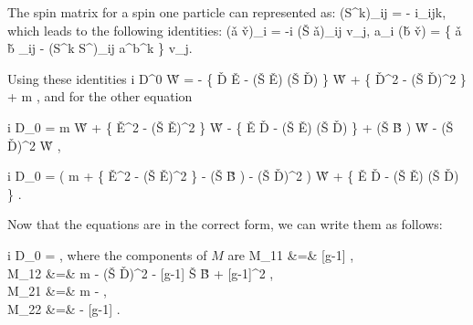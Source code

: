 The spin matrix for a spin one particle can represented as:
\beq
	(S^k)_{ij} = - i\epsilon_{ijk},
\eeq
which leads to the following identities:
\beq
	(\v{a} \times \v{v})_i = -i (\v{S} \cdot \v{a})_{ij} v_j,
\eeq
\beq
	a_i (\v{b} \cdot \v{v}) = \{ \v{a} \cdot \v{b} \; \delta_{ij} - (S^k S^\ell)_{ij} a^\ell b^k \} v_j.
\eeq

Using these identities
\beq
	i D^0 \v{W} = 
		- \{ \v{D} \cdot \v{E} - (\v{S} \cdot \v{E}) (\v{S} \cdot \v{D})	\} \v{W}
		+ \{ \v{D}^2 -  (\v{S} \cdot \v{D})^2 \} \gv{\eta} + m \gv{\eta},
\eeq
and for the other equation

\beq
	i D_0 \gv{\eta} = m \v{W} 
			+  \{ \v{E}^2 - (\v{S} \cdot \v{E})^2 \} \v{W}
			- \{ \v{E} \cdot \v{D} - (\v{S} \cdot \v{E}) (\v{S} \cdot \v{D}) \} \gv{\eta}
			+  (\v{S} \cdot \v{B} ) \v{W}
			 -  (\v{S} \cdot \v{D})^2  \v{W}  ,
\eeq

\beq
	i D_0 \gv{\eta} = \left(
				m 
				+  \{ \v{E}^2 - (\v{S} \cdot \v{E})^2 \} 
				-  (\v{S} \cdot \v{B} )
				-  (\v{S} \cdot \v{D})^2 
			\right ) \v{W} 
			+ \{ \v{E} \cdot \v{D} - (\v{S} \cdot \v{E}) (\v{S} \cdot \v{D}) \} \gv{\eta} .
\eeq

Now that the equations are in the correct form, we can write them as follows:



\beq \label{eq:S1:M}
	i D_0  = ,
\eeq
where the components of $M$ are
\beqa
M_{11} &=&  [g-1]   ,	\\
M_{12}	&=&		m
	- (\v{S} \cdot \v{D})^2 
	- [g-1]  \v{S} \cdot \v{B}
	+ [g-1]^2    ,	\\
M_{21} &=& 
	 m	- 	,	\\
M_{22} &=&  
	 - [g-1]   .  
\eeqa

